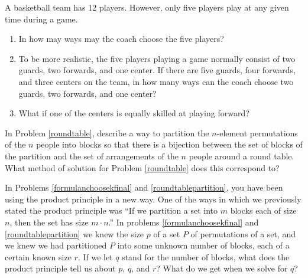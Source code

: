 \itemi A basketball team has 12 players.  However, only five players play at
any given time during a game.
\begin{enumerate}
\item In how may ways may the coach choose the five players?  
\item To be
  more realistic, the five players playing a game normally consist of
  two guards, two forwards, and one center.  If there are five guards,
  four forwards, and three centers on the team, in how many ways can
  the coach choose two guards, two forwards, and one center?  
\item What if
  one of the centers is equally skilled at playing forward?
\end{enumerate}




\iteme In Problem \ref{roundtable}, describe a way to partition the
$n$-element permutations of the $n$ people into blocks so that there is a
bijection between the set of blocks of the partition and the set of
arrangements of the
$n$ people around a round table.  What method of solution for Problem
\ref{roundtable} does this correspond to? \label{roundtablepartition}

\iteme In Problems \ref{formulanchoosekfinal} and \ref{roundtablepartition}, you
have been using the product principle in a new way.  One of the ways in which
we previously stated the product principle was ``If we partition a set into
$m$ blocks each of size $n$, then the set has size $m\cdot n$.''  In problems
\ref{formulanchoosekfinal} and \ref{roundtablepartition} we knew the size $p$ of a
set
$P$ of permutations of a set, and we knew we had partitioned $P$ into some
unknown number of blocks, each of a certain known size $r$.  If we let
$q$ stand for the number of blocks, what does the product principle tell us
about $p$, $q$, and
$r$?  What do we get when we solve for $q$?\label{quotientprinciple}
\ep

